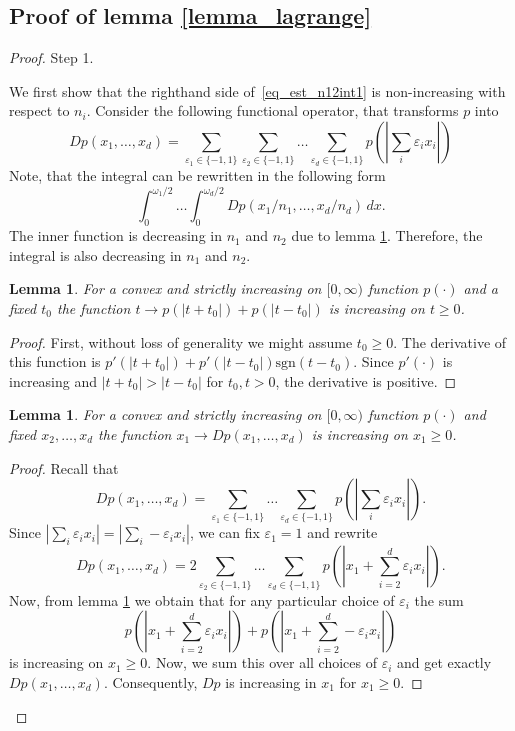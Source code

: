 \documentclass{amsart}
\newtheorem{lemma}[theorem]{Lemma}
\theoremstyle{remark}
\numberwithin{equation}{section}
\numberwithin{figure}{section}
\def\eps{\varepsilon}
\begin{document}
\subsection{Proof of lemma \ref{lemma_lagrange}}
	\begin{proof}
{\sc Step 1}. 

We first show that the righthand side of~\eqref{eq_est_n12int1} is non-increasing with respect to $n_i$. 
Consider the following functional operator, that transforms $p$ into 
\begin{equation}
	\label{eqn_D}
Dp(x_1, \ldots, x_d) = \sum_{\eps_1 \in \{-1, 1\}} \sum_{\eps_2 \in \{-1, 1\}} \ldots \sum_{\eps_d \in \{-1, 1\}} p(|\sum_i \eps_i x_i|)
\end{equation}
Note, that the integral can be rewritten in the following form
\[
\int_0^{\omega_1/2}\ldots \int_0^{\omega_d/2} Dp(x_1/n_1, \ldots, x_d/n_d)\,dx.
\]
The inner function is decreasing in $n_1$ and $n_2$ due to lemma \ref{lemma_D_incr}. Therefore, the integral is also decreasing in $n_1$ and $n_2$.
\begin{lemma}
	\label{lemma_1}
For a convex and strictly increasing on $[0, \infty)$ function $p(\cdot)$ and a fixed $t_0$ the function $t \to p(|t+t_0|) + p(|t - t_0|)$ is increasing on $t \geq 0$.
\end{lemma}
\begin{proof}
First, without loss of generality we might assume $t_0 \geq 0$. The derivative of this function is $p'(|t+t_0|) + p'(|t-t_0|) \textrm{sgn}(t - t_0)$. Since $p'(\cdot)$ is increasing and $|t+t_0| > |t - t_0|$ for $t_0, t > 0$, the derivative is positive.
\end{proof}
\begin{lemma}
	\label{lemma_D_incr}
For a convex and strictly increasing on $[0, \infty)$ function $p(\cdot)$ and fixed $x_2, \ldots, x_d$ the function $x_1 \to Dp(x_1, \ldots, x_d)$ is increasing on $x_1 \geq 0$.
\end{lemma}
\begin{proof}
Recall that
\[
Dp(x_1, \ldots, x_d) = \sum_{\eps_1 \in \{-1, 1\}} \ldots \sum_{\eps_d \in \{-1, 1\}} p(|\sum_i \eps_i x_i|).
\]
Since $|\sum_i \eps_i x_i| = |\sum_i -\eps_i x_i|$, we can fix $\eps_1 = 1$ and rewrite
\[
Dp(x_1, \ldots, x_d) = 2\sum_{\eps_2 \in \{-1, 1\}} \ldots \sum_{\eps_d \in \{-1, 1\}} p(|x_1 + \sum_{i=2}^d \eps_i x_i |).
\]
Now, from lemma \ref{lemma_1} we obtain that for any particular choice of $\eps_i$ the sum
\[
p(|x_1 + \sum_{i=2}^d \eps_i x_i|) + p(|x_1 + \sum_{i=2}^d -\eps_i x_i|)
\]
is increasing on $x_1\geq 0$. Now, we sum this over all choices of $\eps_i$ and get exactly $Dp(x_1, \ldots, x_d)$. Consequently, $Dp$ is increasing in $x_1$ for $x_1 \geq 0$.
\end{proof}


\end{proof}
\end{document}

